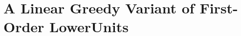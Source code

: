 
\section{A Linear Greedy Variant of First-Order LowerUnits}
\vspace{-0.2cm}
\label{sec:SimpleFOLU}





